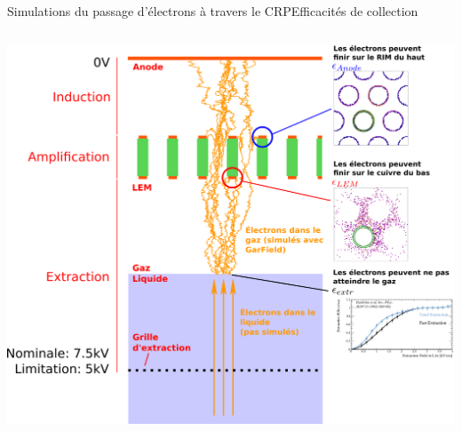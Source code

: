 \begin{frame}{Simulations du passage d'électrons à travers le CRP}{Efficacités de collection}
\begin{scriptsize}
\begin{columns}
\begin{column}{0.65\textwidth}
	    			\includegraphics[width=1.18\textwidth]{./pictures/coll_proba_2.png}\\
	    		\end{column}
	    	\end{columns}
    	\end{scriptsize} 
    \end{frame}

